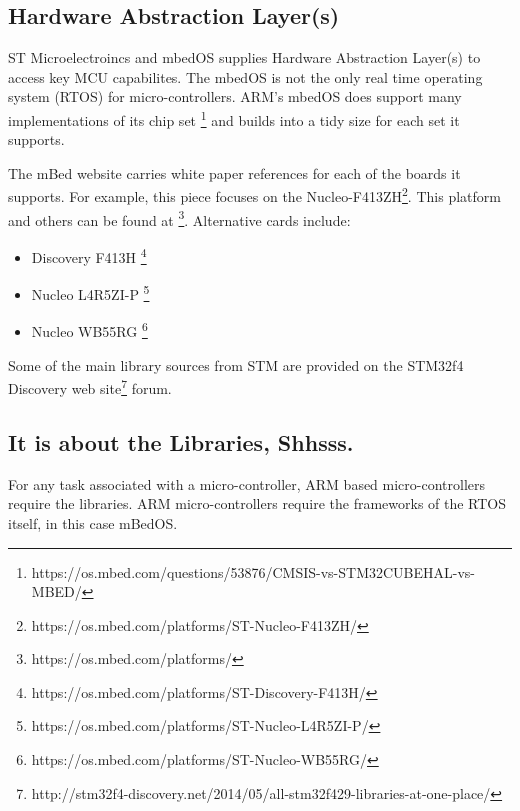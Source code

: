 \documentclass{article}
\begin{document}

\subsection{Hardware Abstraction Layer(s)} %
\label{sub:hardware_abstraction_layer_s}

ST Microelectroincs and mbedOS supplies Hardware Abstraction Layer(s) to access key MCU capabilites.  The mbedOS is not the only real time operating system (RTOS) for micro-controllers.  ARM's mbedOS does support many implementations of its chip set \footnote{https://os.mbed.com/questions/53876/CMSIS-vs-STM32CUBEHAL-vs-MBED/} and builds into a tidy size for each set it supports.




The mBed website carries white paper references for each of the boards it supports.  For example, this piece focuses on the Nucleo-F413ZH\footnote{https://os.mbed.com/platforms/ST-Nucleo-F413ZH/}.  This platform and others can be found at \footnote{https://os.mbed.com/platforms/}.
Alternative cards include:
\begin{itemize}
	\item Discovery F413H \footnote{https://os.mbed.com/platforms/ST-Discovery-F413H/}
	\item Nucleo L4R5ZI-P \footnote{https://os.mbed.com/platforms/ST-Nucleo-L4R5ZI-P/}
	\item Nucleo WB55RG \footnote{https://os.mbed.com/platforms/ST-Nucleo-WB55RG/}
\end{itemize}

Some of the main library sources from STM are provided on the STM32f4 Discovery web site\footnote{http://stm32f4-discovery.net/2014/05/all-stm32f429-libraries-at-one-place/} forum.  



\subsection{It is about the Libraries, Shhsss.} %
\label{sub:it_is_about_the_libraries_shhsss}

For any task associated with a micro-controller, ARM based micro-controllers require the libraries.  ARM micro-controllers require the frameworks of the RTOS itself, in this case mBedOS.  
\end{document}
